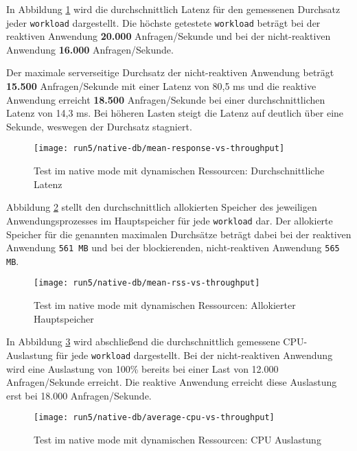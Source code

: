 In Abbildung \ref{fig:native_dynamic_mean_response} wird die durchschnittlich Latenz für den gemessenen Durchsatz jeder \verb|workload| dargestellt.
Die höchste getestete \verb|workload| beträgt bei der reaktiven Anwendung \textbf{20.000} Anfragen/Sekunde und bei der
nicht-reaktiven Anwendung \textbf{16.000} Anfragen/Sekunde.

Der maximale serverseitige Durchsatz der nicht-reaktiven Anwendung beträgt \textbf{15.500} Anfragen/Sekunde mit einer
Latenz von 80,5 ms und
die reaktive Anwendung erreicht \textbf{18.500} Anfragen/Sekunde bei einer durchschnittlichen Latenz von 14,3 ms.
Bei höheren Lasten steigt die Latenz auf deutlich über eine Sekunde, weswegen der Durchsatz stagniert.

\begin{figure}[ht!]
  \centering
  \texttt{[image: run5/native-db/mean-response-vs-throughput]}
  \caption{Test im native mode mit dynamischen Ressourcen: Durchschnittliche Latenz}
  \label{fig:native_dynamic_mean_response}
\end{figure}
\newpage
Abbildung \ref{fig:native_dynamic_mean_rss} stellt den durchschnittlich allokierten Speicher des jeweiligen Anwendungsprozesses
im Hauptspeicher für jede \verb|workload| dar. Der allokierte Speicher für die genannten maximalen Durchsätze beträgt dabei bei
der reaktiven Anwendung \verb|561 MB| und bei der blockierenden, nicht-reaktiven Anwendung \verb|565 MB|.

\begin{figure}[ht!]
  \centering
  \texttt{[image: run5/native-db/mean-rss-vs-throughput]}
  \caption{Test im native mode mit dynamischen Ressourcen: Allokierter Hauptspeicher}
  \label{fig:native_dynamic_mean_rss}
\end{figure}

In Abbildung \ref{fig:native_dynamic_avg_cpu} wird abschließend die durchschnittlich gemessene CPU-Auslastung für jede \verb|workload|
dargestellt. Bei der nicht-reaktiven Anwendung wird eine Auslastung von 100\% bereits bei einer Last von
12.000 Anfragen/Sekunde erreicht. Die reaktive Anwendung erreicht diese Auslastung erst bei 18.000 Anfragen/Sekunde.
\newpage
\begin{figure}[ht!]
  \centering
  \texttt{[image: run5/native-db/average-cpu-vs-throughput]}
  \caption{Test im native mode mit dynamischen Ressourcen: CPU Auslastung}
  \label{fig:native_dynamic_avg_cpu}
\end{figure}

